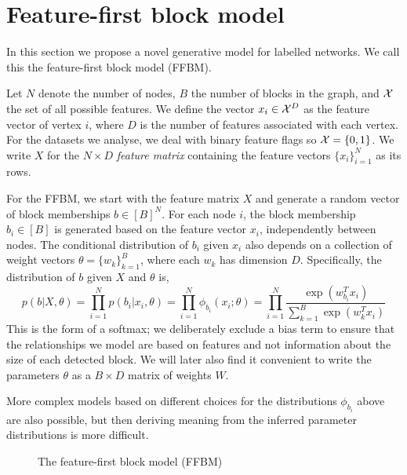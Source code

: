 \section{Feature-first block model}

In this section we propose a novel generative model for labelled networks. We call this the feature-first block model (FFBM).

Let $N$ denote the number of nodes, $B$ the number of blocks in the graph,
and ${\cal X}$ the set of all possible features.
We define the vector $x_i \in \mathcal{X}^D$ as the feature vector of vertex $i$, 
where $D$ is the number of features associated with each vertex.
For the datasets we analyse, we deal with binary feature flags so $\mathcal{X} = \{0, 1\}$. We write $X$ for the $N\times D$ {\em feature matrix} containing
the feature vectors $\{x_i\}_{i=1}^{N}$ 
as its rows.

For the FFBM, we start with the feature matrix $X$ and generate a random
vector of block memberships $b \in [B]^N$. For each node $i$, the
block membership $b_i\in[B]$ is generated based on the feature
vector $x_i$, independently between nodes. The conditional
distribution of $b_i$ given $x_i$ also depends on a collection
of weight vectors $\theta=\{w_k\}_{k=1}^B$, where each
$w_k$ has dimension $D$. Specifically, 
the distribution of $b$ given $X$ and $\theta$ is,
%
\begin{equation}
	p(b| X, \theta) = \prod_{i=1}^{N} p(b_i | x_i, \theta) = \prod_{i=1}^{N} \phi_{b_i} (x_i; \theta)
	= \prod_{i=1}^{N} \frac{\exp\left(w_{b_i}^T x_i\right)}{\sum_{k=1}^{B} \exp \left( w_k^T x_i\right)}
\end{equation}
%
This is the form of a softmax; we deliberately exclude a bias term to ensure that the relationships we model are based on features and not information about the size of each detected block. 
We will later also find it convenient
to write the parameters $\theta$ as a $B \times D$ matrix of weights $W$.

More complex models based on different choices for the distributions
$\phi_{b_i}$ above are also possible, but then deriving meaning from 
the inferred parameter distributions is more difficult. 

\begin{figure}[!h]
	\centering
	\caption{The feature-first block model (FFBM)}
	\label{fig:ffbm}
\end{figure}

